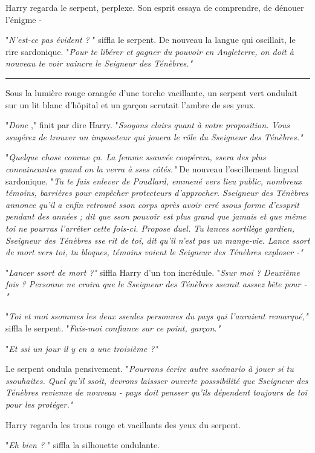 Harry regarda le serpent, perplexe. Son esprit essaya de comprendre, de dénouer l'énigme -

"\emph{N'est-ce pas évident ?} " siffla le serpent. De nouveau la langue qui oscillait, le rire sardonique. "\emph{Pour te libérer et gagner du pouvoir en Angleterre, on doit à nouveau te voir vaincre le Seigneur des Ténèbres."} 
\par\noindent\rule{\textwidth}{0.4pt}
Sous la lumière rouge orangée d'une torche vacillante, un serpent vert ondulait sur un lit blanc d'hôpital et un garçon scrutait l'ambre de ses yeux.

"\emph{Donc} ," finit par dire Harry. "\emph{Ssoyons clairs quant à votre proposition. Vous ssugérez de trouver un impossteur qui jouera le rôle du Sseigneur des Ténèbres."} 

"\emph{Quelque chose comme ça. La femme ssauvée coopérera, ssera des plus convaincantes quand on la verra à sses côtés."}  De nouveau l'oscillement lingual sardonique. "\emph{Tu te fais enlever de Poudlard, emmené vers lieu public, nombreux témoins, barrières pour empêcher protecteurs d'approcher. Sseigneur des Ténèbres annonce qu'il a enfin retrouvé sson corps après avoir erré ssous forme d'essprit pendant des années ; dit que sson pouvoir est plus grand que jamais et que même toi ne pourras l'arrêter cette fois-ci. Propose duel. Tu lances sortilège gardien, Sseigneur des Ténèbres sse rit de toi, dit qu'il n'est pas un mange-vie. Lance ssort de mort vers toi, tu bloques, témoins voient le Seigneur des Ténèbres exploser -"} 

"\emph{Lancer ssort de mort ?"}  siffla Harry d'un ton incrédule. "\emph{Ssur moi ? Deuxième fois ? Personne ne croira que le Sseigneur des Ténèbres sserait asssez bête pour -"} 

"\emph{Toi et moi ssommes les deux sseules personnes du pays qui l'auraient remarqué,"}  siffla le serpent. "\emph{Fais-moi confiance sur ce point, garçon."} 

"\emph{Et ssi un jour il y en a une troisième ?"} 

Le serpent ondula pensivement. "\emph{Pourrons écrire autre sscénario à jouer si tu ssouhaites. Quel qu'il ssoit, devrons laissser ouverte posssibilité que Sseigneur des Ténèbres revienne de nouveau - pays doit pensser qu'ils dépendent toujours de toi pour les protéger."} 

Harry regarda les trous rouge et vacillants des yeux du serpent.

"\emph{Eh bien ?} " siffla la silhouette ondulante.

